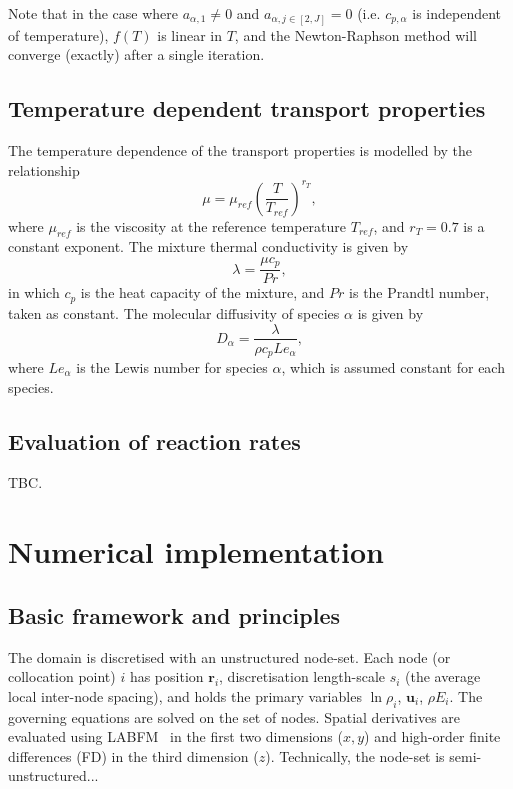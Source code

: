 \documentclass[notitlepage]{revtex4-1}
\begin{document}
Note that in the case where $a_{\alpha,1}\ne0$ and $a_{\alpha,j\in\left[2,J\right]}=0$ (i.e. $c_{p,\alpha}$ is independent of temperature), $f\left(T\right)$ is linear in $T$, and the Newton-Raphson method will converge (exactly) after a single iteration.


\subsection{Temperature dependent transport properties}

The temperature dependence of the transport properties is modelled by the relationship
\begin{equation}\mu=\mu_{ref}\left(\frac{T}{T_{ref}}\right)^{r_{T}},\label{eq:tdtp_mu}\end{equation}
where $\mu_{ref}$ is the viscosity at the reference temperature $T_{ref}$, and $r_{T}=0.7$ is a constant exponent. The mixture thermal conductivity is given by
\begin{equation}\lambda=\frac{\mu{c}_{p}}{Pr},\end{equation}
in which $c_{p}$ is the heat capacity of the mixture, and $Pr$ is the Prandtl number, taken as constant. The molecular diffusivity of species $\alpha$ is given by
\begin{equation}D_{\alpha}=\frac{\lambda}{\rho{c}_{p}Le_{\alpha}},\end{equation}
where $Le_{\alpha}$ is the Lewis number for species $\alpha$, which is assumed constant for each species.



\subsection{Evaluation of reaction rates}

TBC.


\section{Numerical implementation}

\subsection{Basic framework and principles}

The domain is discretised with an unstructured node-set. Each node (or collocation point) $i$ has position $\bm{r}_{i}$, discretisation length-scale $s_{i}$ (the average local inter-node spacing), and holds the primary variables $\ln\rho_{i}$, $\bm{u}_{i}$, $\rho{E}_{i}$. The governing equations are solved on the set of nodes. Spatial derivatives are evaluated using LABFM~\cite{king_labfm_2022} in the first two dimensions ($x,y$) and high-order finite differences (FD) in the third dimension ($z$). Technically, the node-set is semi-unstructured...
\end{document}
